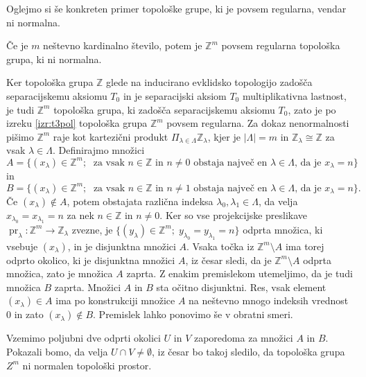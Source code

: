 \documentclass[mat1]{fmfdelo}
\newcommand{\Z}{\mathbb Z}
\DeclareMathOperator{\pr}{pr}
\begin{document}
Oglejmo si še konkreten primer topološke grupe, ki je povsem regularna, vendar ni normalna.

\begin{izrek}\label{izr:t4protiprimer}
Če je $m$ neštevno kardinalno število, potem je $\Z^{m}$ povsem regularna topološka grupa, ki ni normalna.
\end{izrek}

\begin{dokaz}
Ker topološka grupa $\Z$ glede na inducirano evklidsko topologijo zadošča separacijskemu aksiomu $T_0$ in je separacijski aksiom $T_0$ multiplikativna lastnost, je tudi $\Z^m$ topološka grupa, ki zadošča separacijskemu aksiomu $T_0$, zato je po izreku \ref{izr:t3pol} topološka grupa $\Z^m$ povsem regularna. Za dokaz nenormalnosti pišimo $\Z^m$ raje kot kartezični produkt $\Pi_{\lambda \in \Lambda}\Z_\lambda$, kjer je $|\Lambda| = m$ in $\Z_\lambda \cong \Z$ za vsak $\lambda \in \Lambda$. Definirajmo množici
\[ A = \lbrace (x_\lambda) \in \Z^m ;\; \text{ za vsak $n \in \Z$ in $n \neq 0$ obstaja največ en $\lambda \in \Lambda$, da je $x_\lambda = n$}\rbrace \]
in
\[ B = \lbrace (x_\lambda) \in \Z^m ;\; \text{ za vsak $n \in \Z$ in $n \neq 1$ obstaja največ en $\lambda \in \Lambda$, da je $x_\lambda = n$}\rbrace. \]
Če $(x_\lambda) \notin A$, potem obstajata različna indeksa $\lambda_0, \lambda_1 \in \Lambda$, da velja $x_{\lambda_0} = x_{\lambda_1} = n$ za nek $n \in \Z$ in $n \neq 0$. Ker so vse projekcijske preslikave $\pr_{\lambda}\colon \Z^m \to \Z_\lambda$ zvezne, je $\lbrace (y_\lambda) \in \Z^m ;\; y_{\lambda_0} = y_{\lambda_1} = n \rbrace$ odprta množica, ki vsebuje $(x_\lambda)$, in je disjunktna množici $A$. Vsaka točka iz $\Z^m\setminus A$ ima torej odprto okolico, ki je disjunktna množici $A$, iz česar sledi, da je $\Z^m\setminus A$ odprta množica, zato je množica $A$ zaprta. Z enakim premislekom utemeljimo, da je tudi množica $B$ zaprta. Množici $A$ in $B$ sta očitno disjunktni. Res, vsak element $(x_\lambda) \in A$ ima po konstrukciji množice $A$ na neštevno mnogo indeksih vrednost $0$ in zato $(x_\lambda) \notin B$. Premislek lahko ponovimo še v obratni smeri.

Vzemimo poljubni dve odprti okolici $U$ in $V$ zaporedoma za množici $A$ in $B$. Pokazali bomo, da velja $U \cap V \neq \emptyset$, iz česar bo takoj sledilo, da topološka grupa $Z^m$ ni normalen topološki prostor.


\end{dokaz}
\end{document}
